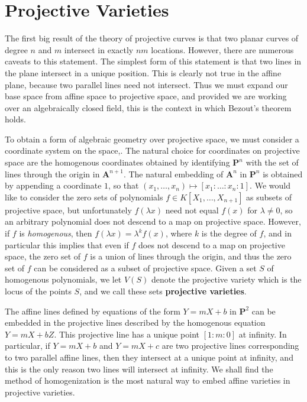 \chapter{Projective Varieties}

The first big result of the theory of projective curves is that two planar curves of degree $n$ and $m$ intersect in exactly $nm$ locations. However, there are numerous caveats to this statement. The simplest form of this statement is that two lines in the plane intersect in a unique position. This is clearly not true in the affine plane, because two parallel lines need not intersect. Thus we must expand our base space from affine space to projective space, and provided we are working over an algebraically closed field, this is the context in which Bezout's theorem holds.

To obtain a form of algebraic geometry over projective space, we must consider a coordinate system on the space,. The natural choice for coordinates on projective space are the homogenous coordinates obtained by identifying $\mathbf{P}^n$ with the set of lines through the origin in $\mathbf{A}^{n+1}$. The natural embedding of $\mathbf{A}^n$ in $\mathbf{P}^n$ is obtained by appending a coordinate $1$, so that $(x_1, \dots, x_n) \mapsto [x_1: \dots: x_n : 1]$. We would like to consider the zero sets of polynomials $f \in K[X_1, \dots, X_{n+1}]$ as subsets of projective space, but unfortunately $f(\lambda x)$ need not equal $f(x)$ for $\lambda \neq 0$, so an arbitrary polynomial does not descend to a map on projective space. However, if $f$ is {\it homogenous}, then $f(\lambda x) = \lambda^k f(x)$, where $k$ is the degree of $f$, and in particular this implies that even if $f$ does not descend to a map on projective space, the zero set of $f$ is a union of lines through the origin, and thus the zero set of $f$ can be considered as a subset of projective space. Given a set $S$ of homogenous polynomials, we let $V(S)$ denote the projective variety which is the locus of the points $S$, and we call these sets {\bf projective varieties}.

\begin{example}
    The affine lines defined by equations of the form $Y = mX + b$ in $\mathbf{P}^2$ can be embedded in the projective lines described by the homogenous equation $Y = mX + bZ$. This projective line has a unique point $[1:m:0]$ at infinity. In particular, if $Y = mX + b$ and $Y = mX + c$ are two projective lines corresponding to two parallel affine lines, then they intersect at a unique point at infinity, and this is the only reason two lines will intersect at infinity. We shall find the method of homogenization is the most natural way to embed affine varieties in projective varieties.
\end{example}

